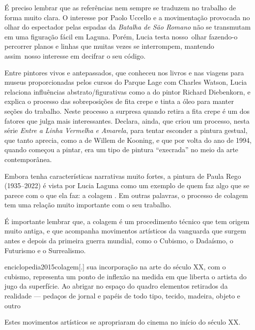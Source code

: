 É preciso lembrar que as referências nem sempre se traduzem no trabalho
de forma muito clara. O interesse por Paolo Uccello e a
movimentação provocada no olhar do espectador pelas espadas da
\emph{Batalha de São Romano} não se transmutam em uma figuração fácil em
Laguna. Porém, Lucia testa nosso~olhar fazendo-o percorrer planos e
linhas que muitas vezes se interrompem, mantendo assim~nosso interesse
em decifrar o seu código.

Entre pintores vivos e antepassados, que conheceu nos livros e nas
viagens para museus proporcionadas pelos cursos do Parque Lage com
Charles Watson, Lucia relaciona influências abstrato/figurativas como a
do pintor Richard Diebenkorn, e explica o processo das sobreposições de
fita crepe e tinta a óleo para manter seções do trabalho. Neste
processo a surpresa quando retira a fita crepe é um dos fatores que
julga mais interessantes. Declara, ainda, que criou um processo, nesta
série \emph{Entre a Linha Vermelha e Amarela}, para tentar esconder a
pintura gestual, que tanto aprecia, como a de Willem de Kooning, e que
por volta do ano de 1994, quando começou a pintar, era um tipo de
pintura \enquote{execrada} no meio da arte contemporânea.

Embora tenha características narrativas muito fortes, a pintura de
Paula Rego (1935--2022) é vista por Lucia Laguna como um exemplo de quem
faz algo que se parece com o que ela faz: a colagem \parencite{cupello2007laguna}. Em
outras palavras, o processo de colagem tem uma relação muito importante
com o seu trabalho.

É importante lembrar que, a colagem é um procedimento técnico que tem
origem muito antiga, e que acompanha movimentos artísticos da vanguarda
que surgem antes e depois da primeira guerra mundial, como o Cubismo, o
Dadaísmo, o Futurismo e o Surrealismo.

\begin{displaycquote}{enciclopedia2015colagem}[.]
	\textelp{} sua incorporação na arte do século XX, com o cubismo, representa
	um ponto de inflexão na medida em que liberta o artista do jugo da
	superfície. Ao abrigar no espaço do quadro elementos retirados da
	realidade --- pedaços de jornal e papéis de todo tipo, tecido, madeira,
	objeto e outro \textelp{}
\end{displaycquote}

Estes movimentos artísticos se apropriaram do cinema no início do
século XX.

